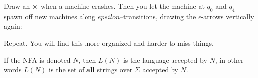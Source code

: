 

Draw an ${\large \times}$ when a machine crashes.
Then you let the machine at $q_0$ and $q_4$
spawn off new machines along $epsilon$--transitions, 
drawing the $\epsilon$-arrows vertically again:



Repeat. You will find this more organized and harder to miss things.

\begin{defn}
If the NFA is denoted $N$, then $L(N)$ is the language accepted by
$N$, in other words $L(N)$ is the set of \textbf{all} strings over
$\Sigma$ accepted by $N$.
\end{defn}



























